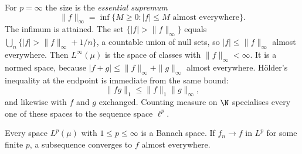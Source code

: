 For $p=\infty$ the size is the \emph{essential supremum}
\[\|f\|_\infty=\inf\{M\ge0:|f|\le M\text{ almost everywhere}\}.\]
The infimum is attained. The set $\{|f|>\|f\|_\infty\}$ equals $\bigcup_n\{|f|>\|f\|_\infty+1/n\}$, a countable union of null sets, so $|f|\le\|f\|_\infty$ almost everywhere. Then $L^\infty(\mu)$ is the space of classes with $\|f\|_\infty<\infty$. It is a normed space, because $|f+g|\le\|f\|_\infty+\|g\|_\infty$ almost everywhere. Hölder's inequality at the endpoint is immediate from the same bound:
\[\|fg\|_1\le\|f\|_1\|g\|_\infty,\]
and likewise with $f$ and $g$ exchanged. Counting measure on $\N$ specialises every one of these spaces to the sequence space $\ell^p$.

\begin{theorem}\label{thm:rieszfischer}
Every space $L^p(\mu)$ with $1\le p\le\infty$ is a Banach space. If $f_n\to f$ in $L^p$ for some finite $p$, a subsequence converges to $f$ almost everywhere.
\end{theorem}
